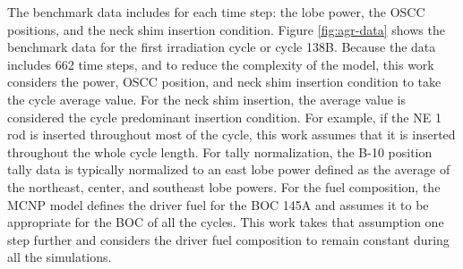 

The benchmark data includes for each time step: the lobe power, the OSCC positions, and the neck shim insertion condition.
Figure \ref{fig:agr-data} shows the benchmark data for the first irradiation cycle or cycle 138B.
Because the data includes 662 time steps, and to reduce the complexity of the model, this work considers the power, OSCC position, and neck shim insertion condition to take the cycle average value.
For the neck shim insertion, the average value is considered the cycle predominant insertion condition.
For example, if the NE 1 rod is inserted throughout most of the cycle, this work assumes that it is inserted throughout the whole cycle length.
For tally normalization, the B-10 position tally data is typically normalized to an east lobe power defined as the average of the northeast, center, and southeast lobe powers.
For the fuel composition, the MCNP model defines the driver fuel for the \gls*{BOC} 145A and assumes it to be appropriate for the \gls*{BOC} of all the cycles.
This work takes that assumption one step further and considers the driver fuel composition to remain constant during all the simulations.

